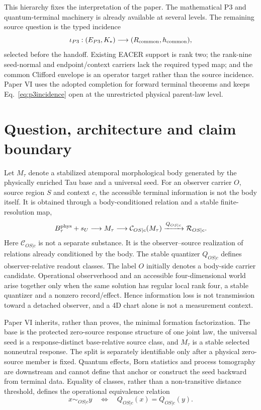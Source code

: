 \documentclass[11pt]{article}
\begin{document}
This hierarchy fixes the interpretation of the paper.  The mathematical P3
and quantum-terminal machinery is already available at several levels.  The
remaining source question is the typed incidence
\begin{equation}
 \iota_{P3}:(E_{P3},K_*)\longrightarrow
 (R_{\rm common},h_{\rm common}),
 \label{eq:p3incidence}
\end{equation}
selected before the handoff.  Existing EACER support is rank two; the
rank-nine seed-normal and endpoint/context carriers lack the required typed
map; and the common Clifford envelope is an operator target rather than the
source incidence.  Paper VI uses the adopted completion for forward terminal
theorems and keeps Eq.~\eqref{eq:p3incidence} open at the unrestricted
physical parent-law level.

\section{Question, architecture and claim boundary}

Let $M_\tau$ denote a stabilized atemporal morphological body generated by the
physically enriched Tau base and a universal seed.  For an observer carrier
$O$, source region $S$ and context $c$, the accessible terminal information is
not the body itself.  It is obtained through a body-conditioned relation and a
stable finite-resolution map,
\begin{equation}
 B_\tau^{\rm phys}+s_U\longrightarrow M_\tau
 \longrightarrow \mathcal C_{OS|c}(M_\tau)
 \xrightarrow{Q_{OS|c}}\mathcal R_{OS|c}.
 \label{eq:spine}
\end{equation}
Here $\mathcal C_{OS|c}$ is not a separate substance.  It is the
observer--source realization of relations already conditioned by the body.
The stable quantizer $Q_{OS|c}$ defines observer-relative readout classes.
The label $O$ initially denotes a body-side carrier candidate.  Operational
observerhood and an accessible four-dimensional world arise together only
when the same solution has regular local rank four, a stable quantizer and a
nonzero record/effect.  Hence information loss is not transmission toward a
detached observer, and a 4D chart alone is not a measurement context.

Paper VI inherits, rather than proves, the minimal formation factorization.
The base is the protected zero-source response structure of one joint law, the
universal seed is a response-distinct base-relative source class, and
$M_\tau$ is a stable selected nonneutral response.  The split is separately
identifiable only after a physical zero-source member is fixed.  Quantum
effects, Born statistics and process tomography are downstream and cannot
define that anchor or construct the seed backward from terminal data.
Equality of classes, rather than a non-transitive distance threshold, defines
the operational equivalence relation
\begin{equation}
 x\sim_{OS|c}y\quad\Longleftrightarrow\quad
 Q_{OS|c}(x)=Q_{OS|c}(y).
 \label{eq:equivalence}
\end{equation}
\end{document}
